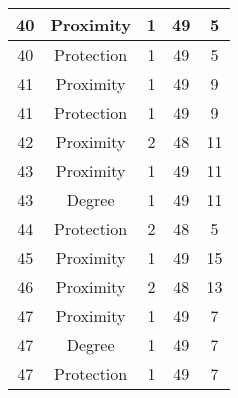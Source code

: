 \documentclass[results.tex]{subfiles}
\begin{document}
\begin{center}
\begin{tabular}{| c || c | c | c | c |}
            \hline
            40                      & Proximity                    & 1                      & 49                      & 5                    \\
            \hline
            40                      & Protection                   & 1                      & 49                      & 5                    \\
            \hline
            41                      & Proximity                    & 1                      & 49                      & 9                    \\
            \hline
            41                      & Protection                   & 1                      & 49                      & 9                    \\
            \hline
            42                      & Proximity                    & 2                      & 48                      & 11                   \\
            \hline
            43                      & Proximity                    & 1                      & 49                      & 11                   \\
            \hline
            43                      & Degree                       & 1                      & 49                      & 11                   \\
            \hline
            44                      & Protection                   & 2                      & 48                      & 5                    \\
            \hline
            45                      & Proximity                    & 1                      & 49                      & 15                   \\
            \hline
            46                      & Proximity                    & 2                      & 48                      & 13                   \\
            \hline
            47                      & Proximity                    & 1                      & 49                      & 7                    \\
            \hline
            47                      & Degree                       & 1                      & 49                      & 7                    \\
            \hline
            47                      & Protection                   & 1                      & 49                      & 7                    \\

\end{tabular}
\end{center}
\end{document}
